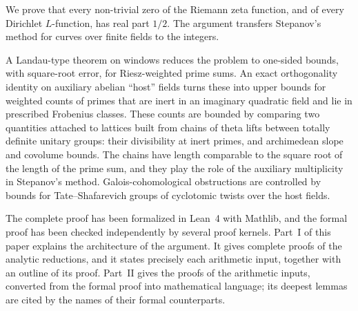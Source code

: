 We prove that every non-trivial zero of the Riemann zeta function, and of every Dirichlet $L$-function,
has real part $1/2$. The argument transfers Stepanov's method for curves over finite fields to the
integers.

A Landau-type theorem on windows reduces the problem to one-sided bounds, with square-root error,
for Riesz-weighted prime sums. An exact orthogonality identity on auxiliary abelian ``host'' fields
turns these into upper bounds for weighted counts of primes that are inert in an imaginary quadratic
field and lie in prescribed Frobenius classes. These counts are bounded by comparing two quantities
attached to lattices built from chains of theta lifts between totally definite unitary groups:
their divisibility at inert primes, and archimedean slope and covolume bounds. The chains have length
comparable to the square root of the length of the prime sum, and they play the role of the auxiliary
multiplicity in Stepanov's method. Galois-cohomological obstructions are controlled by bounds for
Tate--Shafarevich groups of cyclotomic twists over the host fields.

The complete proof has been formalized in Lean~4 with Mathlib, and the formal proof has been checked
independently by several proof kernels. Part~I of this paper explains the architecture of the argument.
It gives complete proofs of the analytic reductions, and it states precisely each arithmetic input,
together with an outline of its proof. Part~II gives the proofs of the arithmetic inputs, converted from
the formal proof into mathematical language; its deepest lemmas are cited by the names of their formal
counterparts.
